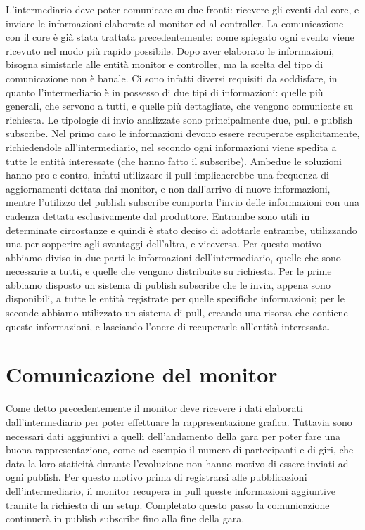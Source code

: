 L’intermediario deve poter comunicare su due fronti: ricevere gli eventi dal core, e inviare le informazioni elaborate al monitor ed al controller.
La comunicazione con il core è già stata trattata precedentemente: come spiegato ogni evento viene ricevuto nel modo più rapido possibile.
Dopo aver elaborato le informazioni, bisogna simistarle alle entità monitor e controller, ma la scelta del tipo di comunicazione non è banale.
Ci sono infatti diversi requisiti da soddisfare, in quanto l’intermediario è in possesso di due tipi di informazioni: quelle più generali, che servono a tutti, e quelle più dettagliate, che vengono comunicate su richiesta.
Le tipologie di invio analizzate sono principalmente due, pull e publish subscribe. Nel primo caso le informazioni devono essere recuperate esplicitamente, richiedendole all’intermediario, nel secondo ogni informazioni viene spedita a tutte le entità interessate (che hanno fatto il subscribe).
Ambedue le soluzioni hanno pro e contro, infatti utilizzare il pull implicherebbe una frequenza di aggiornamenti dettata dai monitor, e non dall’arrivo di nuove informazioni, mentre l’utilizzo del publish subscribe comporta l'invio delle informazioni con una cadenza dettata esclusivamente dal produttore.
Entrambe sono utili in determinate circostanze e quindi è stato deciso di adottarle entrambe, utilizzando una per sopperire agli svantaggi dell’altra, e viceversa.
Per questo motivo abbiamo diviso in due parti le informazioni dell’intermediario, quelle che sono necessarie a tutti, e quelle che vengono distribuite su richiesta. Per le prime abbiamo disposto un sistema di publish subscribe che le invia, appena sono disponibili, a tutte le entità registrate per quelle specifiche informazioni; per le seconde abbiamo utilizzato un sistema di pull, creando una risorsa che contiene queste informazioni, e lasciando l’onere di recuperarle all’entità interessata.


\section{Comunicazione del monitor}

Come detto precedentemente il monitor deve ricevere i dati elaborati dall’intermediario per poter effettuare la rappresentazione grafica.
Tuttavia sono necessari dati aggiuntivi a quelli dell’andamento della gara per poter fare una buona rappresentazione, come ad esempio il numero di partecipanti e di giri, che data la loro staticità durante l’evoluzione non hanno motivo di essere inviati ad ogni publish. Per questo motivo prima di registrarsi alle pubblicazioni dell’intermediario, il monitor recupera in pull queste informazioni aggiuntive tramite la richiesta di un setup.
Completato questo passo la comunicazione continuerà in publish subscribe fino alla fine della gara.

